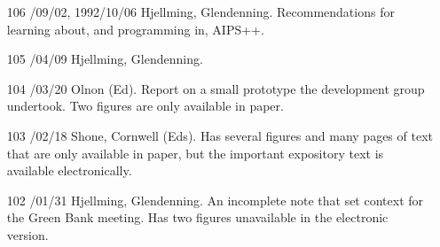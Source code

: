 \begin{enumerate}
\item[106] 
/09/02, 1992/10/06 Hjellming, Glendenning.
\linebreak  Recommendations for learning about, and programming in, AIPS++.

\item[105] 
/04/09 Hjellming, Glendenning.

\item[104] 
/03/20 Olnon (Ed).
\linebreak  Report on a small prototype the development group undertook.
   Two figures are only available in paper.

\item[103] 
/02/18 Shone, Cornwell (Eds).
\linebreak  Has several figures and many pages of text that are only available in
   paper, but the important expository text is available electronically.

\item[102] 
/01/31 Hjellming, Glendenning. 
\linebreak  An incomplete note that set context for the Green Bank meeting. 
   Has two figures unavailable in the electronic version.

\end{enumerate}

